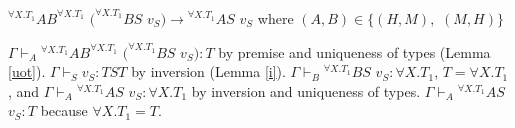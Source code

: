 \begin{case}
$^{\forall X.T_{1}}AB^{\forall X.T_{1}}$ $(^{\forall X.T_{1}}BS$ $v_{S})\rightarrow{^{\forall X.T_{1}}A}S$ $v_{S}$ where $(A,B)\in\lbrace(H,M),$ $(M,H)\rbrace$

$\Gamma\vdash_{A}{^{\forall X.T_{1}}A}B^{\forall X.T_{1}}$ $(^{\forall X.T_{1}}BS$ $v_{S}):T$ by premise and uniqueness of types (Lemma \ref{uot}).  $\Gamma\vdash_{S}v_{S}:TST$ by inversion (Lemma \ref{i}).  $\Gamma\vdash_{B}{^{\forall X.T_{1}}B}S$ $v_{S}:\forall X.T_{1}$, $T=\forall X.T_{1}$, and $\Gamma\vdash_{A}{^{\forall X.T_{1}}A}S$ $v_{S}:\forall X.T_{1}$ by inversion and uniqueness of types.  $\Gamma\vdash_{A}{^{\forall X.T_{1}}A}S$ $v_{S}:T$ because $\forall X.T_{1}=T$.
\end{case}